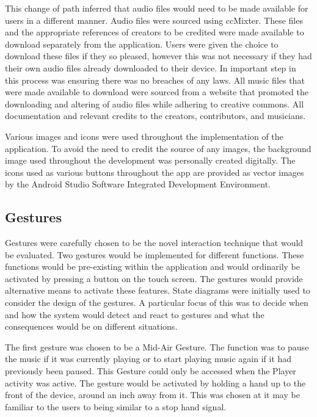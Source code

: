 \documentclass{l4proj}
\begin{document}
This change of path inferred that audio files would need to be made available for users in a different manner. Audio files were sourced using ccMixter. These files and the appropriate references of creators to be credited were made available to download separately from the application. Users were given the choice to download these files if they so pleased, however this was not necessary if they had their own audio files already downloaded to their device. In important step in this process was ensuring there was no breaches of any laws. All music files that were made available to download were sourced from a website that promoted the downloading and altering of audio files while adhering to creative commons. All documentation and relevant credits to the creators, contributors, and musicians.

Various images and icons were used throughout the implementation of the application. To avoid the need to credit the source of any images, the background image used throughout the development was personally created digitally. The icons used as various buttons throughout the app are provided as vector images by the Android Studio Software Integrated Development Environment.


\subsection{Gestures}

Gestures were carefully chosen to be the novel interaction technique that would be evaluated. Two gestures would be implemented for different functions. These functions would be pre-existing within the application and would ordinarily be activated by pressing a button on the touch screen. The gestures would provide alternative means to activate these features. State diagrams were initially used to consider the design of the gestures. A particular focus of this was to decide when and how the system would detect and react to gestures and what the consequences would be on different situations. 

The first gesture was chosen to be a Mid-Air Gesture. The function was to pause the music if it was currently playing or to start playing music again if it had previously been paused. This Gesture could only be accessed when the Player activity was active. The gesture would be activated by holding a hand up to the front of the device, around an inch away from it. This was chosen at it may be familiar to the users to being similar to a stop hand signal. 
\end{document}
